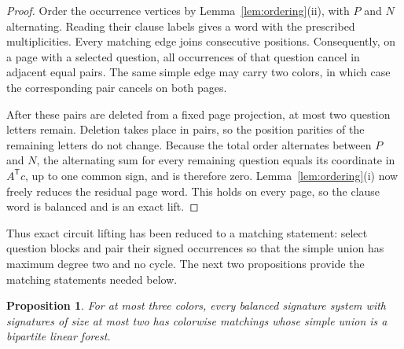 \documentclass[11pt]{article}
\newtheorem{proposition}[theorem]{Proposition}
\theoremstyle{definition}
\theoremstyle{remark}
\numberwithin{equation}{section}
\begin{document}
\begin{proof}
Order the occurrence vertices by Lemma~\ref{lem:ordering}(ii), with \(P\) and
\(N\) alternating.  Reading their clause labels gives a word with the
prescribed multiplicities.  Every matching edge joins consecutive positions.
Consequently, on a page with a selected question, all occurrences of that
question cancel in adjacent equal pairs.  The same simple edge may carry two
colors, in which case the corresponding pair cancels on both pages.

After these pairs are deleted from a fixed page projection, at most two
question letters remain.  Deletion takes place in pairs, so the position
parities of the remaining letters do not change.  Because the total order
alternates between \(P\) and \(N\), the alternating sum for every remaining
question equals its coordinate in \(A^{\mathsf T}c\), up to one common sign,
and is therefore zero.
Lemma~\ref{lem:ordering}(i) now freely reduces the residual page word.  This
holds on every page, so the clause word is balanced and is an exact lift.
\end{proof}

Thus exact circuit lifting has been reduced to a matching statement: select
question blocks and pair their signed occurrences so that the simple union
has maximum degree two and no cycle.  The next two propositions provide the
matching statements needed below.

\begin{proposition}\label{prop:three-color}
For at most three colors, every balanced signature system with signatures
of size at most two has colorwise matchings whose simple union is a
bipartite linear forest.
\end{proposition}
\end{document}
